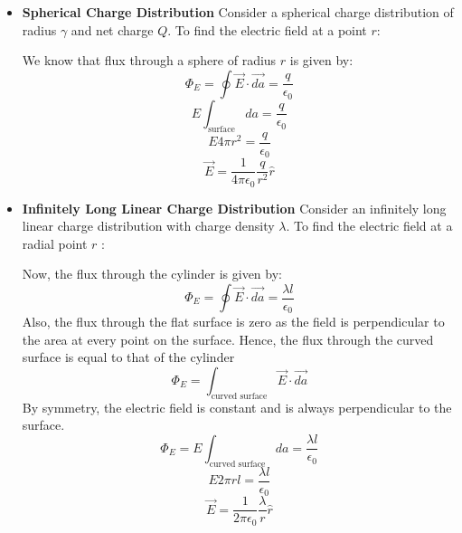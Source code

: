 \documentclass{article}
\begin{document}
\begin{itemize}
	\item \textbf{Spherical Charge Distribution}
	      Consider a spherical charge distribution of radius $\gamma$ and net charge $Q$.
	      To find the electric field at a point $r$:
	      \begin{figure}[H]
		      \centering
	      \end{figure}
	      We know that flux through a sphere of radius $r$ is given by:
	      \[\Phi_E = \oint \vec{E} \cdot \vec{da} = \frac{q}{\epsilon_0}\]
	      \[ E \int_{\text{surface}} da = \frac{q}{\epsilon_0} \]
	      \[ E 4 \pi r^2 = \frac{q}{\epsilon_0} \]
	      \[ \vec{E} = \frac{1}{4 \pi \epsilon_0} \frac{q}{r^2} \hat{r} \]

	\item \textbf{Infinitely Long Linear Charge Distribution}
	      Consider an infinitely long linear charge distribution with charge density $\lambda$.
	      To find the electric field at a radial point $r$ :
	      \begin{figure}[H]
		      \centering
	      \end{figure}
	      Now, the flux through the cylinder is given by:
	      \[\Phi_E = \oint \vec{E} \cdot \vec{da} = \frac{\lambda l}{\epsilon_0}\]
	      Also, the flux through the flat surface is zero as the field is perpendicular to the area at every point on the surface.
	      Hence, the flux through the curved surface is equal to that of the cylinder
	      \[ \Phi_E = \int_{\text{curved surface}} \vec{E}\cdot \vec{da} \]
	      By symmetry, the electric field is constant and is always perpendicular to the surface.
	      \[ \Phi_E = E \int_{\text{curved surface}} da = \frac{\lambda l}{\epsilon_0} \]
	      \[ E 2 \pi r l = \frac{\lambda l}{\epsilon_0} \]
	      \[ \vec{E} = \frac{1}{2 \pi \epsilon_0} \frac{\lambda}{r} \hat{r} \]


\end{itemize}
\end{document}
